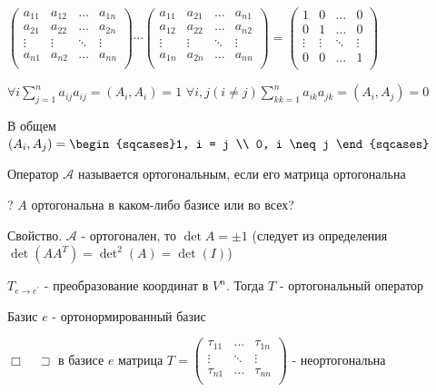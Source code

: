 \documentclass[12pt]{article}
\begin{document}
    $\begin{pmatrix}
         a_{11} & a_{12} & \dots & a_{1n} \\
         a_{21} & a_{22} & \dots & a_{2n} \\
         \vdots & \vdots & \ddots & \vdots \\
         a_{n1} & a_{n2} & \dots & a_{nn} \\
    \end{pmatrix} \cdots \begin{pmatrix}
         a_{11} & a_{21} & \dots & a_{n1} \\
         a_{12} & a_{22} & \dots & a_{n2} \\
         \vdots & \vdots & \ddots & \vdots \\
         a_{1n} & a_{2n} & \dots & a_{nn} \\
    \end{pmatrix} = \begin{pmatrix}
         1 & 0 & \dots & 0 \\
         0 & 1 & \dots & 0 \\
         \vdots & \vdots & \ddots & \vdots \\
         0 & 0 & \dots & 1 \\
    \end{pmatrix}$

    $\forall i \sum^n_{j=1} a_{ij} a_{ij} = (A_i, A_i) = 1$
    $\forall i, j (i \neq j) \sum^n_{kk=1} a_{ik} a_{jk} = (A_i, A_j) = 0$

    В общем $(A_i, A_j) = \begin{sqcases}1, i = j \\ 0, i \neq j \end{sqcases}$

    \Def Оператор $\mathcal{A}$ называется ортогональным, если его матрица ортогональна

    ? $A$ ортогональна в каком-либо базисе или во всех?

    Свойство. $\mathcal{A}$ - ортогонален, то $\det A = \pm 1$ (следует из определения $\det(AA^T) = \det^2(A) = \det(I)$)

    \Th $T_{e\to e^\prime}$ - преобразование координат в $V^n$. Тогда $T$ - ортогональный оператор

    Базис $e$ - ортонормированный базис

    $\Box \quad \sqsupset $ в базисе $e$ матрица $T = \begin{pmatrix}
          \tau_{11} & \dots & \tau_{1n} \\
          \vdots & \ddots & \vdots \\
          \tau_{n1} & \dots & \tau_{nn} \\
    \end{pmatrix}$ - неортогональна
\end{document}
